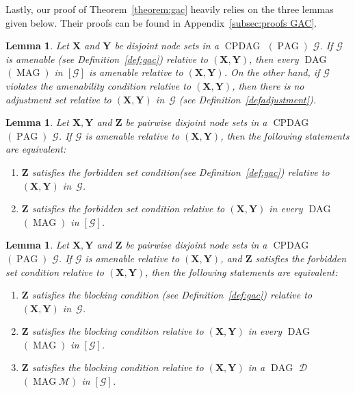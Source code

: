 \documentclass[11pt,a4paper]{article}
\newtheorem{lemma}[definition]{Lemma}
\DeclareMathOperator{\CPDAG}{CPDAG}
\DeclareMathOperator{\DAG}{DAG}
\DeclareMathOperator{\MAG}{MAG}
\DeclareMathOperator{\PAG}{PAG}
\newcommand{\amen}{the amenability condition\xspace}
\newcommand{\forb}{the forbidden set condition\xspace}
\newcommand{\blck}{the blocking condition\xspace}
\newcommand{\g}[1][G]{\mathcal{#1}}
\begin{document}
Lastly, our proof of Theorem~\ref{theorem:gac} heavily relies on the three lemmas given below. Their proofs can be found in Appendix~\ref{subsec:proofs GAC}.

\begin{lemma}
        Let $\mathbf{X}$ and $\mathbf{Y}$ be disjoint node sets in a $\CPDAG$ $(\PAG)$ $\g$. If $\g$ is amenable (see Definition~\ref{def:gac}) relative to $(\mathbf{X},\mathbf{Y})$, then every $\DAG$ $(\MAG)$ in $[\g]$ is amenable relative to $(\mathbf{X},\mathbf{Y})$. On the other hand, if $\g$ violates \amen{} relative to $(\mathbf{X},\mathbf{Y})$, then there is no adjustment set relative to $(\mathbf{X},\mathbf{Y})$ in~$\g$ (see Definition~\ref{defadjustment}).
   \label{lemma:adj amen gen}
\end{lemma}

\begin{lemma}
  Let $\mathbf{X,Y}$ and $\mathbf{Z}$ be pairwise disjoint node sets in a $\CPDAG$ $(\PAG)$ $\g$. If $\g$ is amenable relative to $(\mathbf{X},\mathbf{Y})$, then the following statements are equivalent:
\begin{enumerate}[label = (\roman*)]
\item\label{l:eqa1} $\mathbf{Z}$ satisfies \forb (see Definition~\ref{def:gac}) relative to $(\mathbf{X},\mathbf{Y})$ in~$\g$.
\item\label{l:eqa2}  $\mathbf{Z}$ satisfies \forb relative to $(\mathbf{X},\mathbf{Y})$ in every $\DAG$ $(\MAG)$ in $[\g]$.
\end{enumerate}
   \label{lemmaprovingeqofacconditiona}
\end{lemma}

\begin{lemma}
     Let $\mathbf{X,Y}$ and $\mathbf{Z}$ be pairwise disjoint node sets in a $\CPDAG$ $(\PAG)$ $\g$. If $\g$ is amenable relative to $(\mathbf{X},\mathbf{Y})$, and $\mathbf{Z}$ satisfies \forb{} relative to $(\mathbf{X},\mathbf{Y})$, then the following statements are equivalent:
   \begin{enumerate}[label = (\roman*)]
\item\label{l:eqb1} $\mathbf{Z}$ satisfies \blck{} (see Definition~\ref{def:gac}) relative to $(\mathbf{X},\mathbf{Y})$ in~$\g$.
\item\label{l:eqb2}  $\mathbf{Z}$ satisfies \blck{} relative to $(\mathbf{X},\mathbf{Y})$ in every $\DAG$ $(\MAG)$ in $[\g]$.
\item\label{l:eqb3} $\mathbf{Z}$ satisfies \blck{} relative to $(\mathbf{X},\mathbf{Y})$ in a $\DAG$ $\g[D]$ $(\MAG \g[M])$ in $[\g]$.
\end{enumerate}
   \label{lemmaequivalenceofcondb}
\end{lemma}
\end{document}
